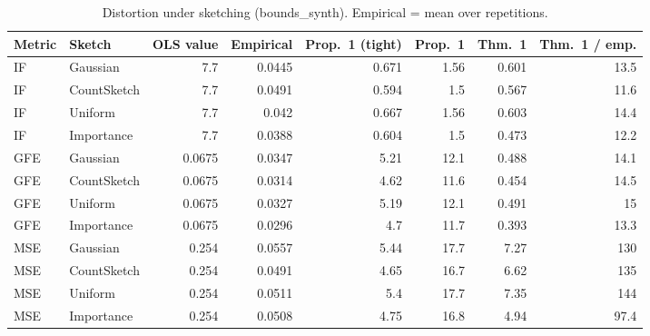 \begin{table}[t]
\centering
\small
\begin{tabular}{llrrrrrr}
\toprule
Metric & Sketch & OLS value & Empirical & Prop.~1 (tight) & Prop.~1 & Thm.~1 & Thm.~1 / emp. \\
\midrule
IF & Gaussian & 7.7 & 0.0445 & 0.671 & 1.56 & 0.601 & 13.5 \\
IF & CountSketch & 7.7 & 0.0491 & 0.594 & 1.5 & 0.567 & 11.6 \\
IF & Uniform & 7.7 & 0.042 & 0.667 & 1.56 & 0.603 & 14.4 \\
IF & Importance & 7.7 & 0.0388 & 0.604 & 1.5 & 0.473 & 12.2 \\
\midrule
GFE & Gaussian & 0.0675 & 0.0347 & 5.21 & 12.1 & 0.488 & 14.1 \\
GFE & CountSketch & 0.0675 & 0.0314 & 4.62 & 11.6 & 0.454 & 14.5 \\
GFE & Uniform & 0.0675 & 0.0327 & 5.19 & 12.1 & 0.491 & 15 \\
GFE & Importance & 0.0675 & 0.0296 & 4.7 & 11.7 & 0.393 & 13.3 \\
\midrule
MSE & Gaussian & 0.254 & 0.0557 & 5.44 & 17.7 & 7.27 & 130 \\
MSE & CountSketch & 0.254 & 0.0491 & 4.65 & 16.7 & 6.62 & 135 \\
MSE & Uniform & 0.254 & 0.0511 & 5.4 & 17.7 & 7.35 & 144 \\
MSE & Importance & 0.254 & 0.0508 & 4.75 & 16.8 & 4.94 & 97.4 \\
\bottomrule
\end{tabular}
\caption{Distortion under sketching (bounds_synth). Empirical = mean over repetitions.}
\label{tab:bounds_synth}
\end{table}